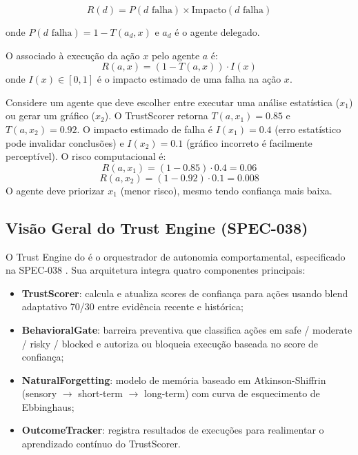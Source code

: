 \[
R(d) = P(d \text{ falha}) \times \text{Impacto}(d \text{ falha})
\]

onde $P(d \text{ falha}) = 1 - T(a_d, x)$ e $a_d$ é o agente
delegado.

\begin{definicao}
O  associado à execução da ação $x$
pelo agente $a$ é:
\[
R(a, x) = (1 - T(a, x)) \cdot I(x)
\]
onde $I(x) \in [0,1]$ é o impacto estimado de uma falha na ação $x$.
\end{definicao}

\begin{exemplo}
Considere um agente que deve escolher entre executar uma análise
estatística ($x_1$) ou gerar um gráfico ($x_2$). O TrustScorer
retorna $T(a, x_1) = 0.85$ e $T(a, x_2) = 0.92$. O impacto estimado
de falha é $I(x_1) = 0.4$ (erro estatístico pode invalidar conclusões)
e $I(x_2) = 0.1$ (gráfico incorreto é facilmente perceptível). O
risco computacional é:
\[
R(a, x_1) = (1 - 0.85) \cdot 0.4 = 0.06
\]
\[
R(a, x_2) = (1 - 0.92) \cdot 0.1 = 0.008
\]
O agente deve priorizar $x_1$ (menor risco), mesmo tendo confiança
mais baixa.
\end{exemplo}

\subsection{Visão Geral do Trust Engine (SPEC-038)}

O Trust Engine do \opencodeeco{} é o orquestrador de autonomia
comportamental, especificado na SPEC-038 \cite{opencode2026spec038}.
Sua arquitetura integra quatro componentes principais:

\begin{itemize}
\item \textbf{TrustScorer}: calcula e atualiza scores de confiança
para ações usando blend adaptativo 70/30 entre evidência recente e
histórica;
\item \textbf{BehavioralGate}: barreira preventiva que classifica
ações em safe / moderate / risky / blocked e autoriza ou bloqueia
execução baseada no score de confiança;
\item \textbf{NaturalForgetting}: modelo de memória baseado em
Atkinson-Shiffrin (sensory $\to$ short-term $\to$ long-term) com
curva de esquecimento de Ebbinghaus;
\item \textbf{OutcomeTracker}: registra resultados de execuções para
realimentar o aprendizado contínuo do TrustScorer.
\end{itemize}

